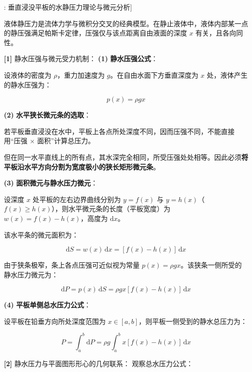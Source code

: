 \documentclass[11pt,a4paper,UTF8]{ctexart}
\begin{document}
\begin{thmbox}[模型[2]: 垂直浸没平板的水静压力理论与微元分析]

液体静压力是流体力学与微积分交叉的经典模型。在静止液体中，液体内部某一点的静压强满足帕斯卡定律，压强仅与该点距离自由液面的深度 $x$ 有关，且各向同性。

\textbf{[1]} 静水压强与微元受力机制：
\textbf{(1)}  \textbf{静水压强公式}：

设液体的密度为 $\rho$，重力加速度为 $g$。在自由水面下方垂直深度为 $x$ 处，液体产生的静水压强为：


\begin{equation*}
p(x) = \rho g x
\end{equation*}


\textbf{(2)}  \textbf{水平狭长微元条的选取}：

若平板垂直浸没在水中，平板上各点所处深度不同，因而压强不同，不能直接用“压强 $\times$ 面积”计算总压力。

但在同一水平直线上的所有点，其水深完全相同，所受压强处处相等。因此必须\textbf{将平板沿水平方向分割为宽度极小的狭长矩形微元条}。

\textbf{(3)}  \textbf{面积微元与静水压力微元}：

设深度 $x$ 处平板的左右边界曲线分别为 $y = f(x)$ 与 $y = h(x)$（$f(x) \geqslant h(x)$），则水平微元条的长度（平板宽度）为 $w(x) = f(x) - h(x)$，高度为 $\mathrm{d}x$。

该水平条的微元面积为：


\begin{equation*}
\mathrm{d}S = w(x)\,\mathrm{d}x = [f(x) - h(x)]\,\mathrm{d}x
\end{equation*}


由于狭条极窄，条上各点压强可近似视为常量 $p(x) = \rho g x$。该狭条一侧所受的静水压力微元为：


\begin{equation*}
\mathrm{d}P = p(x)\,\mathrm{d}S = \rho g x [f(x) - h(x)]\,\mathrm{d}x
\end{equation*}


\textbf{(4)}  \textbf{平板单侧总水压力公式}：

设平板在铅垂方向所处深度范围为 $x \in [a, b]$，则平板一侧受到的静水总压力为：


\begin{equation*}
P = \int_a^b \mathrm{d}P = \rho g \int_a^b x [f(x) - h(x)]\,\mathrm{d}x
\end{equation*}


\textbf{[2]} 静水压力与平面图形形心的几何联系：
观察总水压力公式：



\end{thmbox}
\end{document}

